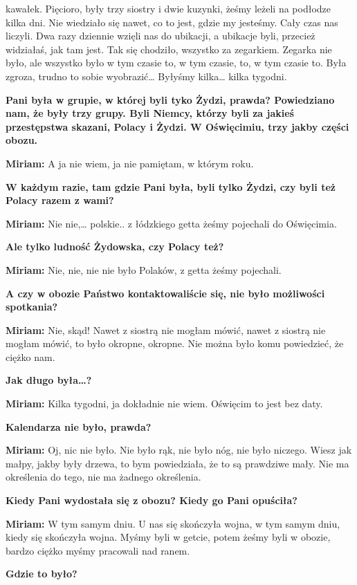 kawałek. Pięcioro, były trzy siostry i dwie kuzynki, żeśmy leżeli na podłodze kilka dni. Nie wiedziało się nawet, co to jest, gdzie my jesteśmy. Cały czas nas liczyli. Dwa razy dziennie wzięli nas do ubikacji, a ubikacje byli, przecież widziałaś, jak tam jest. Tak się chodziło, wszystko za zegarkiem. Zegarka nie było, ale wszystko było w tym czasie to, w tym czasie, to, w tym czasie to. Była zgroza, trudno to sobie wyobrazić… Byłyśmy kilka… kilka tygodni. 

\textbf{Pani była w grupie, w której byli tyko Żydzi, prawda? Powiedziano nam, że były trzy grupy. Byli Niemcy, którzy byli za jakieś przestępstwa skazani, Polacy i Żydzi. W Oświęcimiu, trzy jakby części obozu.} 

\textbf{Miriam:} A ja nie wiem, ja nie pamiętam, w którym roku. 

\textbf{W każdym razie, tam gdzie Pani była, byli tylko Żydzi, czy byli też Polacy razem z wami?} 

\textbf{Miriam:} Nie nie,… polskie.. z łódzkiego getta żeśmy pojechali do Oświęcimia. 

\textbf{Ale tylko ludność Żydowska, czy Polacy też?} 

\textbf{Miriam:} Nie, nie, nie nie było Polaków, z getta żeśmy pojechali. 

\textbf{A czy w obozie Państwo kontaktowaliście się, nie było możliwości spotkania?}

\textbf{Miriam:} Nie, skąd! Nawet z siostrą nie mogłam mówić, nawet z siostrą nie mogłam mówić, to było okropne, okropne. Nie można było komu powiedzieć, że ciężko nam. 

\textbf{Jak długo była…?}  

\textbf{Miriam:} Kilka tygodni, ja dokładnie nie wiem. Oświęcim to jest bez daty. 

\textbf{Kalendarza nie było, prawda?} 

\textbf{Miriam:} Oj, nic nie było. Nie było rąk, nie było nóg, nie było niczego. Wiesz jak małpy, jakby były drzewa, to bym powiedziała, że to są prawdziwe mały. Nie ma określenia do tego, nie ma żadnego określenia. 

\textbf{Kiedy Pani wydostała się z obozu? Kiedy go Pani opuściła?} 

\textbf{Miriam:} W tym samym dniu. U nas się skończyła wojna, w tym samym dniu, kiedy się skończyła wojna. Myśmy byli w getcie, potem żeśmy byli w obozie, bardzo ciężko myśmy pracowali nad ranem.  

\textbf{Gdzie to było?} 

